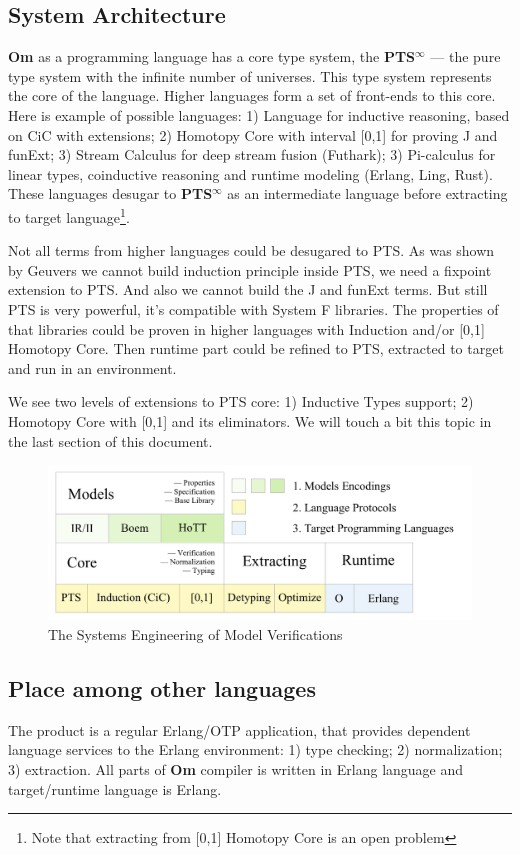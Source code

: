 \documentclass{aip-cp}
\begin{document}
\subsection{System Architecture}
{\bf Om} as a programming language has a core type system, the {\bf PTS$^{\infty}$} --- the pure type system with the infinite number of universes.
This type system represents the core of the language.
Higher languages form a set of front-ends to this core.
 Here is example of possible languages:
1) Language for inductive reasoning, based on CiC with extensions;
2) Homotopy Core with interval [0,1] for proving J and funExt;
3) Stream Calculus for deep stream fusion (Futhark);
3) Pi-calculus for linear types, coinductive reasoning and runtime modeling (Erlang, Ling, Rust).
These languages desugar to {\bf PTS$^{\infty}$} as an intermediate language before extracting to target language\footnote{Note that extracting from [0,1] Homotopy Core is an open problem}.

Not all terms from higher languages could be desugared to PTS.
As was shown by Geuvers\cite{Geuvers01} we cannot build induction principle inside PTS, we need a fixpoint extension to PTS.
And also we cannot build the J and funExt terms.
But still PTS is very powerful, it's compatible with System F libraries.
The properties of that libraries could be proven in higher languages with Induction and/or [0,1] Homotopy Core.
Then runtime part could be refined to PTS, extracted to target and run in an environment.

We see two levels of extensions to PTS core: 1) Inductive Types support; 2) Homotopy Core with [0,1] and its eliminators.
We will touch a bit this topic in the last section of this document.

\begin{figure}[h]
  \centerline{\includegraphics[scale=0.28]{static}}
  \caption{The Systems Engineering of Model Verifications}
\end{figure}

\subsection{Place among other languages}
The product is a regular Erlang/OTP application, that provides dependent language services to the Erlang environment: 1) type checking; 2) normalization; 3) extraction.
All parts of {\bf Om} compiler is written in Erlang language and target/runtime language is Erlang.
\end{document}
